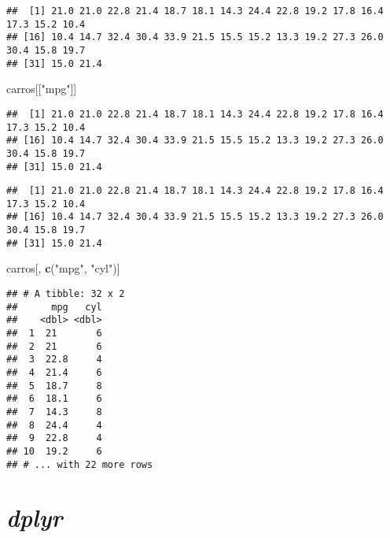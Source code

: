 \documentclass[]{book}
\newenvironment{Shaded}{\begin{snugshade}}{\end{snugshade}}
\newcommand{\KeywordTok}[1]{\textcolor[rgb]{0.13,0.29,0.53}{\textbf{#1}}}
\newcommand{\NormalTok}[1]{#1}
\newcommand{\OperatorTok}[1]{\textcolor[rgb]{0.81,0.36,0.00}{\textbf{#1}}}
\newcommand{\StringTok}[1]{\textcolor[rgb]{0.31,0.60,0.02}{#1}}
\begin{document}
\begin{verbatim}
##  [1] 21.0 21.0 22.8 21.4 18.7 18.1 14.3 24.4 22.8 19.2 17.8 16.4 17.3 15.2 10.4
## [16] 10.4 14.7 32.4 30.4 33.9 21.5 15.5 15.2 13.3 19.2 27.3 26.0 30.4 15.8 19.7
## [31] 15.0 21.4
\end{verbatim}

\begin{Shaded}
\begin{Highlighting}[]
\NormalTok{carros[[}\StringTok{"mpg"}\NormalTok{]]}
\end{Highlighting}
\end{Shaded}

\begin{verbatim}
##  [1] 21.0 21.0 22.8 21.4 18.7 18.1 14.3 24.4 22.8 19.2 17.8 16.4 17.3 15.2 10.4
## [16] 10.4 14.7 32.4 30.4 33.9 21.5 15.5 15.2 13.3 19.2 27.3 26.0 30.4 15.8 19.7
## [31] 15.0 21.4
\end{verbatim}

\begin{Shaded}
\end{Shaded}

\begin{verbatim}
##  [1] 21.0 21.0 22.8 21.4 18.7 18.1 14.3 24.4 22.8 19.2 17.8 16.4 17.3 15.2 10.4
## [16] 10.4 14.7 32.4 30.4 33.9 21.5 15.5 15.2 13.3 19.2 27.3 26.0 30.4 15.8 19.7
## [31] 15.0 21.4
\end{verbatim}

\begin{Shaded}
\begin{Highlighting}[]
\NormalTok{carros[, }\KeywordTok{c}\NormalTok{(}\StringTok{"mpg"}\NormalTok{, }\StringTok{"cyl"}\NormalTok{)]}
\end{Highlighting}
\end{Shaded}

\begin{verbatim}
## # A tibble: 32 x 2
##      mpg   cyl
##    <dbl> <dbl>
##  1  21       6
##  2  21       6
##  3  22.8     4
##  4  21.4     6
##  5  18.7     8
##  6  18.1     6
##  7  14.3     8
##  8  24.4     4
##  9  22.8     4
## 10  19.2     6
## # ... with 22 more rows
\end{verbatim}

\hypertarget{dplyr}{%
\chapter{\texorpdfstring{\emph{dplyr}}{dplyr}}\label{dplyr}}
\end{document}
